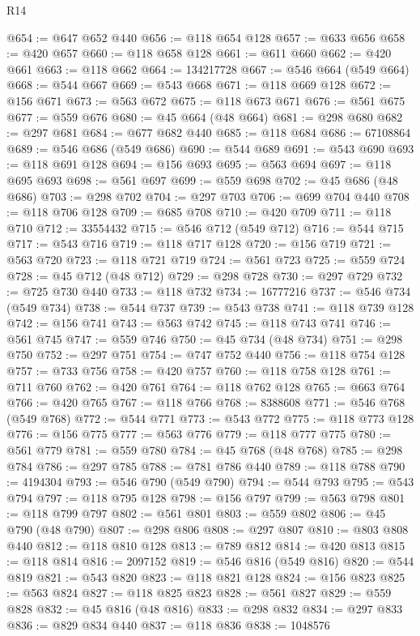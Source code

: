 \begin{lexlean}{R14}
\begin{coremodule}
@654 := @647 @652 @440
@656 := @118 @654 @128
@657 := @633 @656
@658 := @420 @657
@660 := @118 @658 @128
@661 := @611 @660
@662 := @420 @661
@663 := @118 @662
@664 := 134217728
@667 := @546 @664 (@549 @664)
@668 := @544 @667
@669 := @543 @668
@671 := @118 @669 @128
@672 := @156 @671
@673 := @563 @672
@675 := @118 @673 @671
@676 := @561 @675
@677 := @559 @676
@680 := @45 @664 (@48 @664)
@681 := @298 @680
@682 := @297 @681
@684 := @677 @682 @440
@685 := @118 @684
@686 := 67108864
@689 := @546 @686 (@549 @686)
@690 := @544 @689
@691 := @543 @690
@693 := @118 @691 @128
@694 := @156 @693
@695 := @563 @694
@697 := @118 @695 @693
@698 := @561 @697
@699 := @559 @698
@702 := @45 @686 (@48 @686)
@703 := @298 @702
@704 := @297 @703
@706 := @699 @704 @440
@708 := @118 @706 @128
@709 := @685 @708
@710 := @420 @709
@711 := @118 @710
@712 := 33554432
@715 := @546 @712 (@549 @712)
@716 := @544 @715
@717 := @543 @716
@719 := @118 @717 @128
@720 := @156 @719
@721 := @563 @720
@723 := @118 @721 @719
@724 := @561 @723
@725 := @559 @724
@728 := @45 @712 (@48 @712)
@729 := @298 @728
@730 := @297 @729
@732 := @725 @730 @440
@733 := @118 @732
@734 := 16777216
@737 := @546 @734 (@549 @734)
@738 := @544 @737
@739 := @543 @738
@741 := @118 @739 @128
@742 := @156 @741
@743 := @563 @742
@745 := @118 @743 @741
@746 := @561 @745
@747 := @559 @746
@750 := @45 @734 (@48 @734)
@751 := @298 @750
@752 := @297 @751
@754 := @747 @752 @440
@756 := @118 @754 @128
@757 := @733 @756
@758 := @420 @757
@760 := @118 @758 @128
@761 := @711 @760
@762 := @420 @761
@764 := @118 @762 @128
@765 := @663 @764
@766 := @420 @765
@767 := @118 @766
@768 := 8388608
@771 := @546 @768 (@549 @768)
@772 := @544 @771
@773 := @543 @772
@775 := @118 @773 @128
@776 := @156 @775
@777 := @563 @776
@779 := @118 @777 @775
@780 := @561 @779
@781 := @559 @780
@784 := @45 @768 (@48 @768)
@785 := @298 @784
@786 := @297 @785
@788 := @781 @786 @440
@789 := @118 @788
@790 := 4194304
@793 := @546 @790 (@549 @790)
@794 := @544 @793
@795 := @543 @794
@797 := @118 @795 @128
@798 := @156 @797
@799 := @563 @798
@801 := @118 @799 @797
@802 := @561 @801
@803 := @559 @802
@806 := @45 @790 (@48 @790)
@807 := @298 @806
@808 := @297 @807
@810 := @803 @808 @440
@812 := @118 @810 @128
@813 := @789 @812
@814 := @420 @813
@815 := @118 @814
@816 := 2097152
@819 := @546 @816 (@549 @816)
@820 := @544 @819
@821 := @543 @820
@823 := @118 @821 @128
@824 := @156 @823
@825 := @563 @824
@827 := @118 @825 @823
@828 := @561 @827
@829 := @559 @828
@832 := @45 @816 (@48 @816)
@833 := @298 @832
@834 := @297 @833
@836 := @829 @834 @440
@837 := @118 @836
@838 := 1048576

\end{coremodule}
\end{lexlean}
